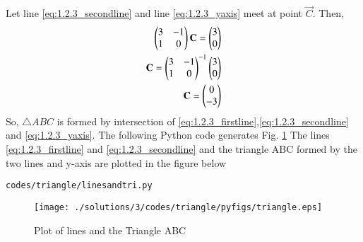 Let line \eqref{eq:1.2.3_secondline} and  line \eqref{eq:1.2.3_yaxis} meet at point $\vec{C}$. Then, 
\begin{align}
\begin{pmatrix}3&-1\\1&0\end{pmatrix}\mathbf{C} =\begin{pmatrix}3\\0\end{pmatrix}
\\
\mathbf{C}={\begin{pmatrix}3&-1\\1&0\end{pmatrix}}^{-1}\begin{pmatrix}3\\0\end{pmatrix}
\\
\mathbf{C}=\begin{pmatrix}0\\-3\end{pmatrix}
\end{align}
So, $\triangle ABC$ is formed by intersection of \eqref{eq:1.2.3_firstline},\eqref{eq:1.2.3_secondline} and \eqref{eq:1.2.3_yaxis}. The  following Python code generates Fig. \ref{fig:1.2.3_tri_py}
%
The lines \eqref{eq:1.2.3_firstline} and \eqref{eq:1.2.3_secondline} and the triangle ABC formed by the two lines and y-axis are plotted in the figure below
\begin{lstlisting}
codes/triangle/linesandtri.py
\end{lstlisting}
\begin{figure}[!ht]
\centering
\texttt{[image: ./solutions/3/codes/triangle/pyfigs/triangle.eps]}
\caption{Plot of lines and the Triangle ABC }
\label{fig:1.2.3_tri_py}
\end{figure}

